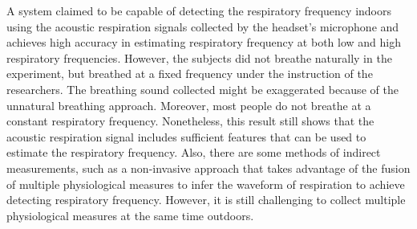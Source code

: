 A system claimed to be capable of detecting the respiratory frequency indoors using the acoustic respiration signals collected by the headset’s microphone and achieves high accuracy in estimating respiratory frequency at both low and high respiratory frequencies.\cite{Nam2016EstimationHeadset} However, the subjects did not breathe naturally in the experiment, but breathed at a fixed frequency under the instruction of the researchers. The breathing sound collected might be exaggerated because of the unnatural breathing approach. Moreover, most people do not breathe at a constant respiratory frequency. Nonetheless, this result still shows that the acoustic respiration signal includes sufficient features that can be used to estimate the respiratory frequency. Also, there are some methods of indirect measurements, such as a non-invasive approach that takes advantage of the fusion of multiple physiological measures to infer the waveform of respiration to achieve detecting respiratory frequency.\cite{Mason2002SignalMonitoring} However, it is still challenging to collect multiple physiological measures at the same time outdoors.


